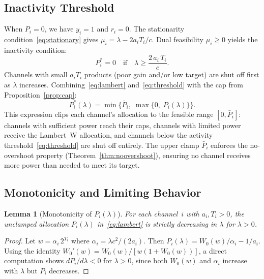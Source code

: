 \documentclass[journal]{IEEEtran}
\newtheorem{lemma}{Lemma}
\begin{document}
\subsection{Inactivity Threshold}

When $P_i = 0$, we have $y_i = 1$ and $r_i = 0$.
The stationarity condition~\eqref{eq:stationary} gives $\mu_i = \lambda - 2a_i T_i / c$.
Dual feasibility $\mu_i \ge 0$ yields the inactivity condition:
\begin{equation}
P_i^* = 0 \quad\text{if}\quad \lambda \ge \frac{2\,a_i\,T_i}{c}.
\label{eq:threshold}
\end{equation}
Channels with small $a_i T_i$ products (poor gain and/or low target) are shut off first as $\lambda$ increases.
Combining~\eqref{eq:lambert} and~\eqref{eq:threshold} with the cap from Proposition~\ref{prop:cap}:
\begin{equation}
P_i^*(\lambda) = \min\Big\{\bar{P}_i,\;\max\big\{0,\; P_i(\lambda)\big\}\Big\}.
\label{eq:final}
\end{equation}
This expression clips each channel's allocation to the feasible range $[0, \bar{P}_i]$: channels with sufficient power reach their caps, channels with limited power receive the Lambert~W allocation, and channels below the activity threshold~\eqref{eq:threshold} are shut off entirely.
The upper clamp $\bar{P}_i$ enforces the no-overshoot property (Theorem~\ref{thm:noovershoot}), ensuring no channel receives more power than needed to meet its target.

\subsection{Monotonicity and Limiting Behavior}

\begin{lemma}[Monotonicity of $P_i(\lambda)$]
\label{lem:monotone}
For each channel~$i$ with $a_i, T_i > 0$, the unclamped allocation $P_i(\lambda)$ in~\eqref{eq:lambert} is strictly decreasing in $\lambda$ for $\lambda > 0$.
\end{lemma}

\begin{proof}
Let $w = \alpha_i\, 2^{T_i}$ where $\alpha_i = \lambda c^2 / (2a_i)$.
Then $P_i(\lambda) = W_0(w)/\alpha_i - 1/a_i$.
Using the identity $W_0'(w) = W_0(w)/[w(1 + W_0(w))]$, a direct computation shows $dP_i/d\lambda < 0$ for $\lambda > 0$, since both $W_0(w)$ and $\alpha_i$ increase with $\lambda$ but $P_i$ decreases.
\end{proof}
\end{document}
